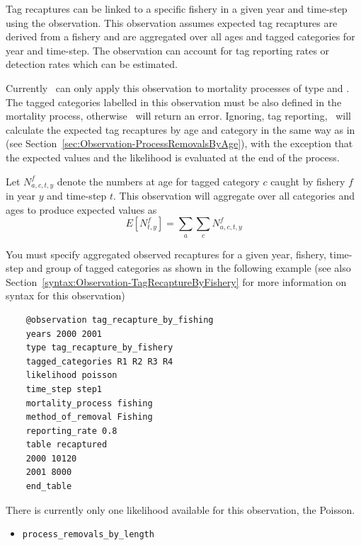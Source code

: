 Tag recaptures can be linked to a specific fishery in a given year and time-step using the  observation. This observation assumes expected tag recaptures are derived from a fishery and are aggregated over all ages and tagged categories for year and time-step. The observation can account for tag reporting rates or detection rates which can be estimated.

Currently \CNAME\ can only apply this observation to mortality processes of type  and . The tagged categories labelled in this observation must be also defined in the mortality process, otherwise \CNAME\ will return an error. Ignoring, tag reporting, \CNAME\ will calculate the expected tag recaptures by age and category in the same way as in  (see Section~\ref{sec:Observation-ProcessRemovalsByAge}), with the exception that the expected values and the likelihood is evaluated at the end of the process.

Let \(N^f_{a,c,t, y}\) denote the numbers at age for tagged category \(c\) caught by fishery \(f\) in year \(y\) and time-step \(t\). This observation will aggregate over all categories and ages to produce expected values as
\[
E[N^f_{t, y}] = \sum\limits_a\sum\limits_c N^f_{a,c,t, y}
\]

You must specify aggregated observed recaptures for a given year, fishery, time-step and group of tagged categories as shown in the following example (see also Section~\ref{syntax:Observation-TagRecaptureByFishery} for more information on syntax for this observation)

{\small{\begin{verbatim}
	@observation tag_recapture_by_fishing
	years 2000 2001
	type tag_recapture_by_fishery
	tagged_categories R1 R2 R3 R4 
	likelihood poisson
	time_step step1
	mortality_process fishing
	method_of_removal Fishing
	reporting_rate 0.8
	table recaptured
	2000 10120
	2001 8000
	end_table
\end{verbatim}}}

There is currently only one likelihood available for this observation, the Poisson.

\else
\begin{itemize}
	\item \texttt{process\_removals\_by\_length}
\end{itemize}	

\subsubsection{ \label{sec:removals-by-length}} \label{sec:Observation-ProcessRemovalsByLength}

